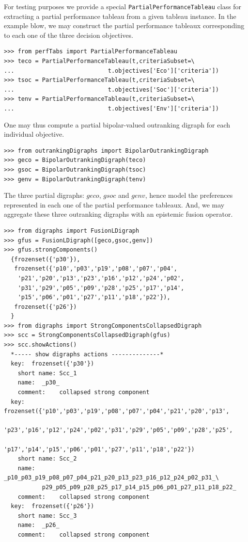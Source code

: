 For testing purposes we provide a special \texttt{PartialPerformanceTableau} class for extracting a partial performance tableau from a given tableau instance. In the example blow, we may construct the partial performance tableaux corresponding to each one of the three decision objectives.
\begin{lstlisting}
>>> from perfTabs import PartialPerformanceTableau
>>> teco = PartialPerformanceTableau(t,criteriaSubset=\
...                           t.objectives['Eco']['criteria'])
>>> tsoc = PartialPerformanceTableau(t,criteriaSubset=\
...                           t.objectives['Soc']['criteria'])
>>> tenv = PartialPerformanceTableau(t,criteriaSubset=\
...                           t.objectives['Env']['criteria'])
\end{lstlisting}

One may thus compute a partial bipolar-valued outranking digraph for each individual objective.
\begin{lstlisting}
>>> from outrankingDigraphs import BipolarOutrankingDigraph
>>> geco = BipolarOutrankingDigraph(teco)
>>> gsoc = BipolarOutrankingDigraph(tsoc)
>>> genv = BipolarOutrankingDigraph(tenv)
\end{lstlisting}

The three partial digraphs: $geco$, $gsoc$ and $genv$,  hence model the preferences represented in each one of the partial performance tableaux. And, we may aggregate these three outranking digraphs with an epistemic fusion operator.
\begin{lstlisting}[basicstyle=\scriptsize]
>>> from digraphs import FusionLDigraph
>>> gfus = FusionLDigraph([geco,gsoc,genv])
>>> gfus.strongComponents()
  {frozenset({'p30'}), 
   frozenset({'p10','p03','p19','p08','p07','p04',
    'p21','p20','p13','p23','p16','p12','p24','p02',
    'p31','p29','p05','p09','p28','p25','p17','p14',
    'p15','p06','p01','p27','p11','p18','p22'}), 
   frozenset({'p26'})
  }
>>> from digraphs import StrongComponentsCollapsedDigraph
>>> scc = StrongComponentsCollapsedDigraph(gfus)
>>> scc.showActions()
  *----- show digraphs actions --------------*
  key:  frozenset({'p30'})
    short name: Scc_1
    name:  _p30_
    comment:    collapsed strong component
  key:  frozenset({'p10','p03','p19','p08','p07','p04','p21','p20','p13',
                   'p23','p16','p12','p24','p02','p31','p29','p05','p09','p28','p25',
                   'p17','p14','p15','p06','p01','p27','p11','p18','p22'})
    short name: Scc_2
    name: _p10_p03_p19_p08_p07_p04_p21_p20_p13_p23_p16_p12_p24_p02_p31_\
           p29_p05_p09_p28_p25_p17_p14_p15_p06_p01_p27_p11_p18_p22_
    comment:    collapsed strong component
  key:  frozenset({'p26'})
    short name: Scc_3
    name:  _p26_
    comment:    collapsed strong component
\end{lstlisting}

